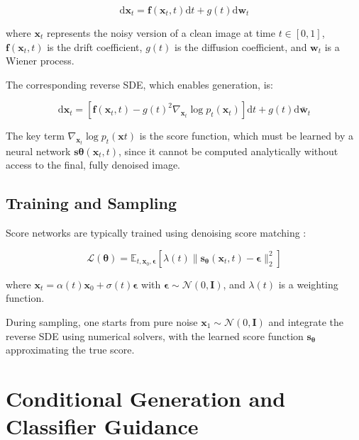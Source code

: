 \documentclass[licencjacka,en]{pracamgr}
\newcommand{\diff}{\mathrm{d}}
\begin{document}
\begin{equation}
\diff \mathbf{x}_t = \mathbf{f}(\mathbf{x}_t, t) \diff t + g(t) \diff \mathbf{w}_t
\label{eq:forward_sde}
\end{equation}

where $\mathbf{x}_t$ represents the noisy version of a clean image at time $t \in [0, 1]$, $\mathbf{f}(\mathbf{x}_t, t)$ is the drift coefficient, $g(t)$ is the diffusion coefficient, and $\mathbf{w}_t$ is a Wiener process.

The corresponding reverse SDE, which enables generation, is:

\begin{equation}
\diff \mathbf{x}_t = [\mathbf{f}(\mathbf{x}_t, t) - g(t)^2 \nabla_{\mathbf{x}_t} \log p_t(\mathbf{x}_t)] \diff t + g(t) \diff \bar{\mathbf{w}}_t
\label{eq:reverse_sde}
\end{equation}

The key term $\nabla_{\mathbf{x}_t} \log p_t(\mathbf{x}t)$ is the score function, which must be learned by a neural network $\mathbf{s}{\boldsymbol{\theta}}(\mathbf{x}_t, t)$, since it cannot be computed analytically without access to the final, fully denoised image.

\subsection{Training and Sampling}

Score networks are typically trained using denoising score matching \citep{6795935, song2020generativemodelingestimatinggradients}:

\begin{equation}
\mathcal{L}(\boldsymbol{\theta}) = \mathbb{E}_{t, \mathbf{x}_0, \boldsymbol{\epsilon}} \left[ \lambda(t) \|\mathbf{s}_{\boldsymbol{\theta}}(\mathbf{x}_t, t) - \boldsymbol{\epsilon}\|_2^2 \right]
\label{eq:score_matching_loss}
\end{equation}

where $\mathbf{x}_t = \alpha(t)\mathbf{x}_0 + \sigma(t)\boldsymbol{\epsilon}$ with $\boldsymbol{\epsilon} \sim \mathcal{N}(0, \mathbf{I})$, and $\lambda(t)$ is a weighting function.

During sampling, one starts from pure noise $\mathbf{x}_1 \sim \mathcal{N}(0, \mathbf{I})$ and integrate the reverse SDE using numerical solvers, with the learned score function $\mathbf{s}_{\boldsymbol{\theta}}$ approximating the true score.

\section{Conditional Generation and Classifier Guidance}
\end{document}
